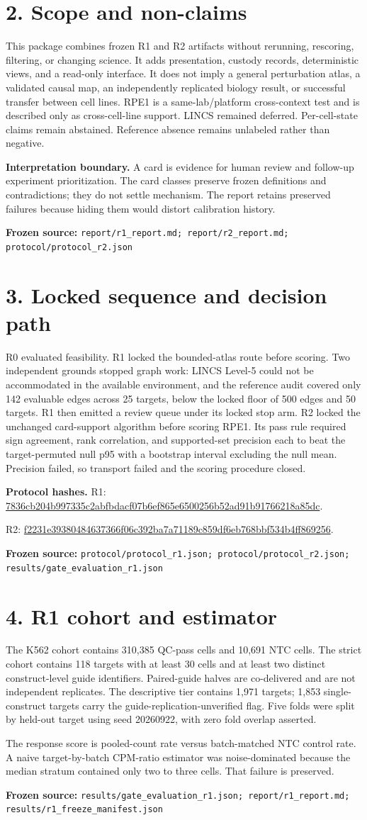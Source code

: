 \documentclass[10pt]{article}
\newcommand{\src}[1]{\par\vfill\noindent\parbox{\linewidth}{\raggedright\sloppy\scriptsize\color{BorderBlue}\textbf{Frozen source:} \texttt{#1}}}
\newcommand{\pg}[2]{\section*{#1}#2}
\begin{document}
\pg{2. Scope and non-claims}{This package combines frozen R1 and R2 artifacts without rerunning, rescoring, filtering, or changing science. It adds presentation, custody records, deterministic views, and a read-only interface. It does not imply a general perturbation atlas, a validated causal map, an independently replicated biology result, or successful transfer between cell lines. RPE1 is a same-lab/platform cross-context test and is described only as cross-cell-line support. LINCS remained deferred. Per-cell-state claims remain abstained. Reference absence remains unlabeled rather than negative.\par\textbf{Interpretation boundary.} A card is evidence for human review and follow-up experiment prioritization. The card classes preserve frozen definitions and contradictions; they do not settle mechanism. The report retains preserved failures because hiding them would distort calibration history.\src{report/r1\_report.md; report/r2\_report.md; protocol/protocol\_r2.json}}\newpage

\pg{3. Locked sequence and decision path}{R0 evaluated feasibility. R1 locked the bounded-atlas route before scoring. Two independent grounds stopped graph work: LINCS Level-5 could not be accommodated in the available environment, and the reference audit covered only 142 evaluable edges across 25 targets, below the locked floor of 500 edges and 50 targets. R1 then emitted a review queue under its locked stop arm. R2 locked the unchanged card-support algorithm before scoring RPE1. Its pass rule required sign agreement, rank correlation, and supported-set precision each to beat the target-permuted null p95 with a bootstrap interval excluding the null mean. Precision failed, so transport failed and the scoring procedure closed.\par\textbf{Protocol hashes.} R1: \url{7836cb204b997335c2abfbdacf07b6ef865e6500256b52ad91b91766218a85dc}.\par R2: \url{f2231e39380484637366f06c392ba7a71189c859df6eb768bbf534b4ff869256}.\src{protocol/protocol\_r1.json; protocol/protocol\_r2.json; results/gate\_evaluation\_r1.json}}\newpage

\pg{4. R1 cohort and estimator}{The K562 cohort contains 310,385 QC-pass cells and 10,691 NTC cells. The strict cohort contains 118 targets with at least 30 cells and at least two distinct construct-level guide identifiers. Paired-guide halves are co-delivered and are not independent replicates. The descriptive tier contains 1,971 targets; 1,853 single-construct targets carry the guide-replication-unverified flag. Five folds were split by held-out target using seed 20260922, with zero fold overlap asserted.\par The response score is pooled-count rate versus batch-matched NTC control rate. A naive target-by-batch CPM-ratio estimator was noise-dominated because the median stratum contained only two to three cells. That failure is preserved.\src{results/gate\_evaluation\_r1.json; report/r1\_report.md; results/r1\_freeze\_manifest.json}}\newpage
\end{document}
